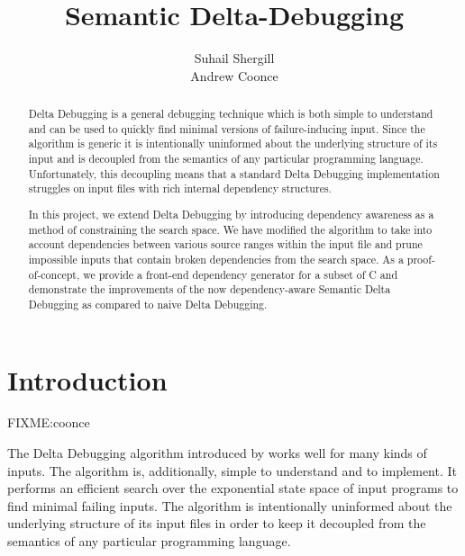\documentclass[preprint]{acm_proc_article-sp}
\begin{document}
\title{Semantic Delta-Debugging}


\author{
\alignauthor
Suhail Shergill\\
\alignauthor
Andrew Coonce\\
}

\date{}

\maketitle
\begin{abstract}
Delta Debugging is a general debugging technique which is both simple to
understand and can be used to quickly find minimal versions of failure-inducing
input. Since the algorithm is generic it is intentionally uninformed about the
underlying structure of its input and is decoupled from the semantics of any
particular programming language. Unfortunately, this decoupling means that a
standard Delta Debugging implementation struggles on input files with rich
internal dependency structures.

In this project, we extend Delta Debugging by introducing dependency awareness
as a method of constraining the search space. We have modified the algorithm to
take into account dependencies between various source ranges within the input
file and prune impossible inputs that contain broken dependencies from the
search space. As a proof-of-concept, we provide a front-end dependency generator
for a subset of C and demonstrate the improvements of the now dependency-aware
Semantic Delta Debugging as compared to naive Delta Debugging.
\end{abstract}




\section{Introduction}
\label{sec:intro}
FIXME:coonce

The Delta Debugging algorithm introduced by \citet{dd} works well for many kinds
of inputs. The algorithm is, additionally, simple to understand and to
implement. It performs an efficient search over the exponential state space of
input programs to find minimal failing inputs. The algorithm is intentionally
uninformed about the underlying structure of its input files in order to keep it
decoupled from the semantics of any particular programming language. 
\end{document}
